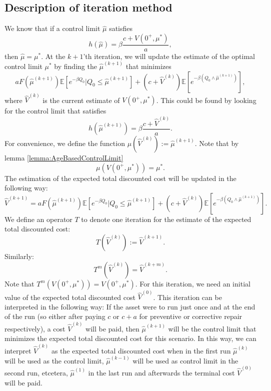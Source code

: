 \subsection{Description of iteration method}\label{section:AgeBasedIterationDescription}
We know that if a control limit $\hat{\mu}$ satisfies
\[h(\hat{\mu})=\beta\frac{c+V(0^+,\mu^*)}{a},\]
then $\hat{\mu}=\mu^*$.
At the $k+1$'th iteration, we will update the estimate of the optimal control limit $\mu^*$ by finding the $\hat{\mu}^{(k+1)}$ that minimizes
\[
aF(\hat{\mu}^{(k+1)})\mathbb{E}[e^{-\beta Q_0}|Q_0\leq \hat{\mu}^{(k+1)}]+(c+\hat{V}^{(k)})\mathbb{E}[e^{-\beta(Q_0\wedge\hat{\mu}^{(k+1)})}],
\]
where $\hat{V}^{(k)}$ is the current estimate of $V(0^+,\mu^*)$.
This could be found by looking for the control limit that satisfies
\begin{equation}\label{eq:AgeBasedIterationBound}
h(\hat{\mu}^{(k+1)})=\beta\frac{c+\hat{V}^{(k)}}{a}.\end{equation}
For convenience, we define the function $\mu(\hat{V}^{(k)}):=\hat{\mu}^{(k+1)}$.
Note that by lemma \ref{lemma:AgeBasedControlLimit}
\begin{equation}\label{eq:AgeBasedIterationControlConvergence}
\mu(V(0^+,\mu^*))=\mu^*.
\end{equation}
The estimation of the expected total discounted cost will be updated in the following way:
\[\hat{V}^{(k+1)}=aF(\hat{\mu}^{(k+1)})\mathbb{E}[e^{-\beta Q_0}|Q_0\leq \hat{\mu}^{(k+1)}]+(c+\hat{V}^{(k)})\mathbb{E}[e^{-\beta(Q_0\wedge\hat{\mu}^{(k+1)})}].\]
We define an operator $T$ to denote one iteration for the estimate of the expected total discounted cost:
\[T(\hat{V}^{(k)}):=\hat{V}^{(k+1)}.\]
Similarly:
\[T^m(\hat{V}^{(k)})=\hat{V}^{(k+m)}.\]
Note that $T^m(V(0^+,\mu^*))=V(0^+,\mu^*)$.
For this iteration, we need an initial value of the expected total discounted cost $\hat{V}^{(0)}$.
This iteration can be interpreted in the following way:
If the asset were to run just once and at the end of the run (so either after paying $c$ or $c+a$ for preventive or corrective repair respectively), a cost $\hat{V}^{(k)}$ will be paid, then $\hat{\mu}^{(k+1)}$ will be the control limit that minimizes the expected total discounted cost for this scenario.
In this way, we can interpret $\hat{V}^{(k)}$ as the expected total discounted cost when in the first run $\hat{\mu}^{(k)}$ will be used as the control limit, $\hat{\mu}^{(k-1)}$ will be used as control limit in the second run, etcetera, $\hat{\mu}^{(1)}$ in the last run and afterwards the terminal cost $\hat{V}^{(0)}$ will be paid.

